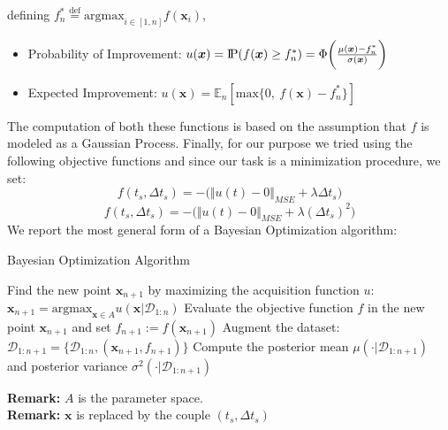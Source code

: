 \documentclass[11pt,a4paper]{article}
\begin{document}
defining $f_{n}^{*} \overset{\operatorname{def}}{=} \textrm{argmax}_{i  \in  [1,n]} f(\boldsymbol{x}_{i})$,
\begin{itemize}
    \item Probability of Improvement: $u(\boldsymbol{x}) = \text{I\kern-0.15em P}(f(\boldsymbol{x})\ge f_{n}^{*})=\Phi\biggl({\mu(\boldsymbol{x})-f_{n}^{*}\over \sigma(\boldsymbol{x})}\biggl)$
    \item Expected Improvement: $u(\boldsymbol{x}) = \mathbb{E}_{n}[\textrm{max}\{0, \  f(\boldsymbol{x})-f_{n}^{*}\}]$
\end{itemize}
\vspace{1mm}
The computation of both these functions is based on the assumption that $f$ is modeled as a Gaussian Process. Finally, for our purpose we tried using the following objective functions and since our task is a minimization procedure, we set:
\begin{equation*}
    f(t_s, \Delta t_s) = - \big( \Vert u(t)-0 \Vert_{MSE} + \lambda \Delta t_s \big)
\end{equation*}
\begin{equation*}
    f(t_s, \Delta t_s) = - \big( \Vert u(t)-0 \Vert_{MSE} + \lambda (\Delta t_s)^2 \big)
\end{equation*}
We report the most general form of a Bayesian Optimization algorithm:
\begin{algorithm}[H]
\caption{Bayesian Optimization Algorithm}
\begin{algorithmic}
\vspace{1mm}
     \State Find the new point $\boldsymbol{x}_{n+1}$ by maximizing the acquisition function $u$: $\boldsymbol{x}_{n+1} = \textrm{argmax}_{ \boldsymbol{x} \in A} u(\boldsymbol{x} \vert \mathcal{D}_{1:n})$
    \vspace{1mm}
    \State Evaluate the objective function $f$ in the new point $\boldsymbol{x}_{n+1}$ and set $f_{n+1} := f(\boldsymbol{x}_{n+1})$
    \vspace{1mm}
    \State Augment the dataset: $\mathcal{D}_{1:n+1} = \{ \mathcal{D}_{1:n}, (\boldsymbol{x}_{n+1}, f_{n+1})\}$
    \vspace{1mm}
    \State Compute the posterior mean $\mu( \cdot \vert \mathcal{D}_{1:n+1} )$ and posterior variance $\sigma^{2}(\cdot \vert \mathcal{D}_{1:n+1})$
    \vspace{1mm}
\EndFor
\end{algorithmic}
\smaller
\vspace{0.3cm}
\textbf{Remark:} $A$ is the parameter space.\\
\textbf{Remark:} $\boldsymbol{x}$ is replaced by the couple $(t_s, \Delta t_s)$
\normalsize
\end{algorithm}
\end{document}
